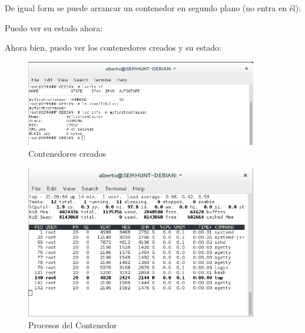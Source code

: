 \documentclass[1pt]{article} %
\begin{document}
De igual form se puede arrancar un contenedor en segundo plano (no entra en él):

\begin{center}\end{center}

Puedo ver su estado ahora:

\begin{center}\end{center}

Ahora bien, puedo ver los contenedores creados y su estado:
\begin{center}\end{center}

\newpage

\begin{figure}[!ht]
	\begin{center}
		\includegraphics[width=0.9\textwidth]{17.png}
		\caption{Contenedores creados }
	\end{center}
\end{figure}
\begin{figure}[!ht]
	\begin{center}
		\includegraphics[width=0.9\textwidth]{18.png}
		\caption{Procesos del Contenedor }
	\end{center}
\end{figure}
\end{document}
